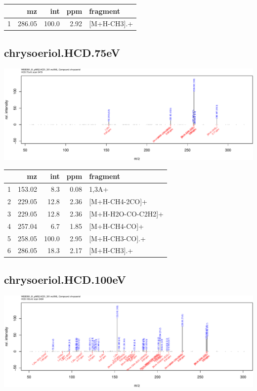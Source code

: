 \documentclass[]{article}
\begin{document}
\begin{table}[ht]
\centering
\begin{tabular}{rrrrl}
  \toprule
 & mz & int & ppm & fragment \\ 
  \midrule
1 & 286.05 & 100.0 & 2.92 & [M+H-CH3].+ \\ 
   \bottomrule
\end{tabular}
\end{table}

\clearpage\subsection{chrysoeriol.HCD.75eV}
\includegraphics[width=\textwidth]{WEB350_files/figure-latex/unnamed-chunk-3-23}

\begin{table}[ht]
\centering
\begin{tabular}{rrrrl}
  \toprule
 & mz & int & ppm & fragment \\ 
  \midrule
1 & 153.02 & 8.3 & 0.08 & 1,3A+ \\ 
  2 & 229.05 & 12.8 & 2.36 & [M+H-CH4-2CO]+ \\ 
  3 & 229.05 & 12.8 & 2.36 & [M+H-H2O-CO-C2H2]+ \\ 
  4 & 257.04 & 6.7 & 1.85 & [M+H-CH4-CO]+ \\ 
  5 & 258.05 & 100.0 & 2.95 & [M+H-CH3-CO].+ \\ 
  6 & 286.05 & 18.3 & 2.17 & [M+H-CH3].+ \\ 
   \bottomrule
\end{tabular}
\end{table}

\clearpage\subsection{chrysoeriol.HCD.100eV}
\includegraphics[width=\textwidth]{WEB350_files/figure-latex/unnamed-chunk-3-24}
\end{document}
